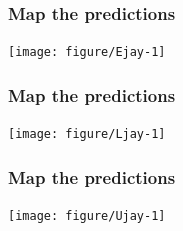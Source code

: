 \documentclass[color=usenames,dvipsnames]{beamer}\usepackage[]{graphicx}\usepackage[]{color}
\begin{document}
\begin{frame}[fragile]
  \frametitle{Map the predictions}
  \scriptsize

\texttt{[image: figure/Ejay-1]}
\end{frame}




\begin{frame}[fragile]
  \frametitle{Map the predictions}
  \scriptsize

\texttt{[image: figure/Ljay-1]}
\end{frame}




\begin{frame}[fragile]
  \frametitle{Map the predictions}
  \scriptsize

\texttt{[image: figure/Ujay-1]}
\end{frame}












\end{document}
